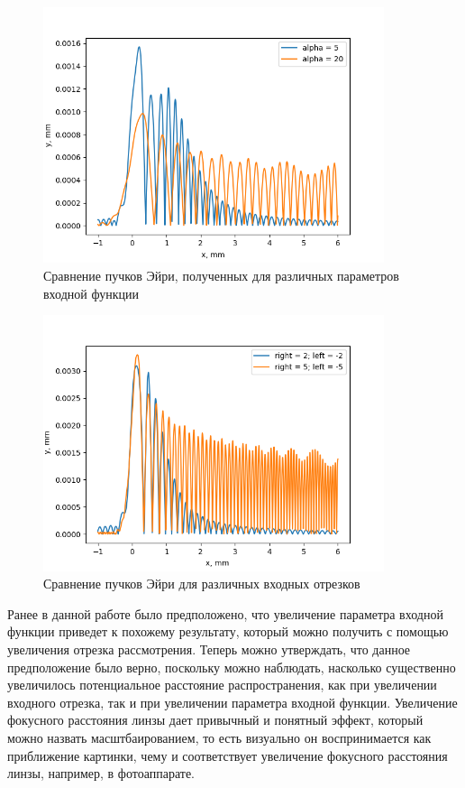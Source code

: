 { \begin{figure}[H]
		  \begin{center}
			\includegraphics[width=10cm]{plots/ai_param_comparison}
	\caption{Сравнение пучков Эйри, полученных для различных параметров входной функции}
	\label{ai_param_comparison}
		 \end{center}
\end{figure}

 \begin{figure}[H]
		  \begin{center}
			\includegraphics[width=10cm]{plots/ai_input_comparison}
	\caption{Сравнение пучков Эйри для различных входных отрезков}
	\label{ai_input_comparison}
		 \end{center}
	
\end{figure}

Ранее в данной работе было предположено, что увеличение параметра входной функции приведет к похожему результату, который можно получить с помощью увеличения отрезка рассмотрения. Теперь можно утверждать, что данное предположение было верно, поскольку можно наблюдать, насколько существенно увеличилось потенциальное расстояние распространения, как при увеличении входного отрезка, так и при увеличении параметра входной функции. Увеличение фокусного расстояния линзы дает привычный и понятный эффект, который можно назвать масштбаированием, то есть визуально он воспринимается как приближение картинки, чему и соответствует увеличение фокусного расстояния линзы, например, в фотоаппарате.

}
